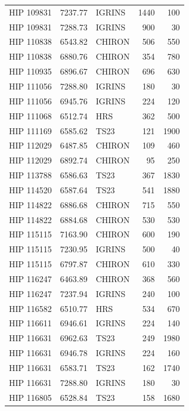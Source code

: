 {\begin{scriptsize}
\begin{longtable}{|l|rlrr|}
  HIP 109831 &  7237.77 &     IGRINS &     1440 &   100 \\
  HIP 109831 &  7288.73 &     IGRINS &      900 &    30 \\
  HIP 110838 &  6543.82 &     CHIRON &      506 &   550 \\
  HIP 110838 &  6880.76 &     CHIRON &      354 &   780 \\
  HIP 110935 &  6896.67 &     CHIRON &      696 &   630 \\
  HIP 111056 &  7288.80 &     IGRINS &      180 &    30 \\
  HIP 111056 &  6945.76 &     IGRINS &      224 &   120 \\
  HIP 111068 &  6512.74 &        HRS &      362 &   500 \\
  HIP 111169 &  6585.62 &       TS23 &      121 &  1900 \\
  HIP 112029 &  6487.85 &     CHIRON &      109 &   460 \\
  HIP 112029 &  6892.74 &     CHIRON &       95 &   250 \\
  HIP 113788 &  6586.63 &       TS23 &      367 &  1830 \\
  HIP 114520 &  6587.64 &       TS23 &      541 &  1880 \\
  HIP 114822 &  6886.68 &     CHIRON &      715 &   550 \\
  HIP 114822 &  6884.68 &     CHIRON &      530 &   530 \\
  HIP 115115 &  7163.90 &     CHIRON &      600 &   190 \\
  HIP 115115 &  7230.95 &     IGRINS &      500 &    40 \\
  HIP 115115 &  6797.87 &     CHIRON &      610 &   330 \\
  HIP 116247 &  6463.89 &     CHIRON &      368 &   560 \\
  HIP 116247 &  7237.94 &     IGRINS &      240 &   100 \\
  HIP 116582 &  6510.77 &        HRS &      534 &   670 \\
  HIP 116611 &  6946.61 &     IGRINS &      224 &   140 \\
  HIP 116631 &  6962.63 &       TS23 &      249 &  1980 \\
  HIP 116631 &  6946.78 &     IGRINS &      224 &   160 \\
  HIP 116631 &  6583.71 &       TS23 &      162 &  1740 \\
  HIP 116631 &  7288.80 &     IGRINS &      180 &    30 \\
  HIP 116805 &  6528.84 &       TS23 &      158 &  1680 \\

\end{longtable}
\end{scriptsize}}
